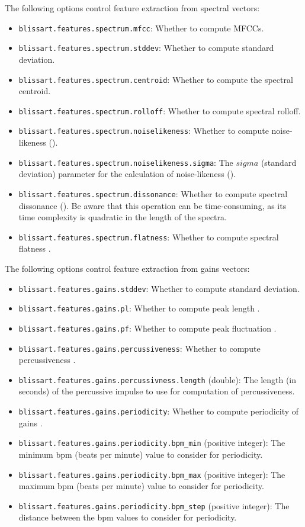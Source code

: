 The following options control feature extraction from spectral vectors:
\begin{itemize}
  \item {\tt blissart.features.spectrum.mfcc}: Whether to compute MFCCs.
  \item {\tt blissart.features.spectrum.stddev}: Whether to compute standard
    deviation.
  \item {\tt blissart.features.spectrum.centroid}: Whether to compute the
    spectral centroid.
  \item {\tt blissart.features.spectrum.rolloff}: Whether to compute spectral
    rolloff.
  \item {\tt blissart.features.spectrum.noiselikeness}: Whether to compute
    noise-likeness (\cite{Uhle2003}).
  \item {\tt blissart.features.spectrum.noiselikeness.sigma}: The $sigma$
    (standard deviation) parameter for the calculation of noise-likeness
    (\cite{Uhle2003}).
  \item {\tt blissart.features.spectrum.dissonance}: Whether to compute spectral
    dissonance (\cite{Uhle2003}).  Be aware that this operation can be
    time-consuming, as its time complexity is quadratic in the length of the
    spectra.
  \item {\tt blissart.features.spectrum.flatness}: Whether to compute spectral
    flatness \cite{Uhle2003}.
\end{itemize}

The following options control feature extraction from gains vectors:
\begin{itemize}
  \item {\tt blissart.features.gains.stddev}: Whether to compute standard
    deviation.
  \item {\tt blissart.features.gains.pl}: Whether to compute peak length
    \cite{Virtanen2005}.
  \item {\tt blissart.features.gains.pf}: Whether to compute peak fluctuation
    \cite{Virtanen2005}.
  \item {\tt blissart.features.gains.percussiveness}: Whether to compute
    percussiveness \cite{Uhle2003}.
  \item {\tt blissart.features.gains.percussivness.length} (double): The length
    (in seconds) of the percussive impulse to use for computation of
    percussiveness.
  \item {\tt blissart.features.gains.periodicity}: Whether to compute
    periodicity of gains \cite{Virtanen2005}.
  \item {\tt blissart.features.gains.periodicity.bpm\_min} (positive integer):
    The minimum bpm (beats per minute) value to consider for periodicity.
  \item {\tt blissart.features.gains.periodicity.bpm\_max} (positive integer):
    The maximum bpm (beats per minute) value to consider for periodicity.
  \item {\tt blissart.features.gains.periodicity.bpm\_step} (positive integer):
    The distance between the bpm values to consider for periodicity.
\end{itemize}



